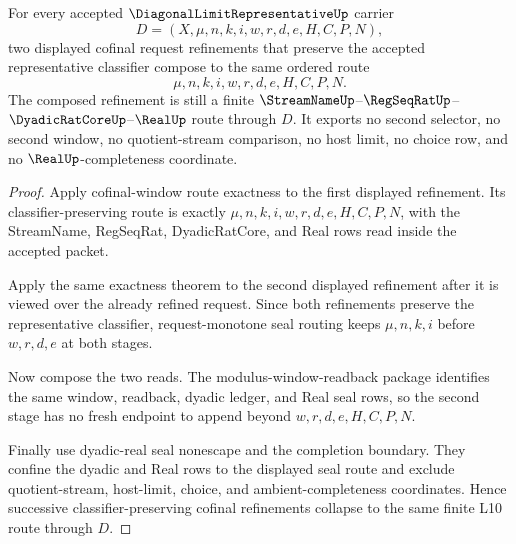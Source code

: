 \begin{theorem}
\label{thm:diagonal-limit-representative-cofinal-refinement-functoriality}
For every accepted $\DiagonalLimitRepresentativeUp$ carrier
$$
D=(X,\mu,n,k,i,w,r,d,e,H,C,P,N),
$$
two displayed cofinal request refinements that preserve the accepted representative classifier compose to the same ordered route
$$
\mu,n,k,i,w,r,d,e,H,C,P,N.
$$
The composed refinement is still a finite $\StreamNameUp$--$\RegSeqRatUp$--$\DyadicRatCoreUp$--$\RealUp$ route through $D$. It exports no second selector, no second window, no quotient-stream comparison, no host limit, no choice row, and no $\RealUp$-completeness coordinate.
\end{theorem}
\begin{proof}
Apply cofinal-window route exactness to the first displayed refinement. Its classifier-preserving route is exactly $\mu,n,k,i,w,r,d,e,H,C,P,N$, with the StreamName, RegSeqRat, DyadicRatCore, and Real rows read inside the accepted packet.

Apply the same exactness theorem to the second displayed refinement after it is viewed over the already refined request. Since both refinements preserve the representative classifier, request-monotone seal routing keeps $\mu,n,k,i$ before $w,r,d,e$ at both stages.

Now compose the two reads. The modulus-window-readback package identifies the same window, readback, dyadic ledger, and Real seal rows, so the second stage has no fresh endpoint to append beyond $w,r,d,e,H,C,P,N$.

Finally use dyadic-real seal nonescape and the completion boundary. They confine the dyadic and Real rows to the displayed seal route and exclude quotient-stream, host-limit, choice, and ambient-completeness coordinates. Hence successive classifier-preserving cofinal refinements collapse to the same finite L10 route through $D$.
\end{proof}


